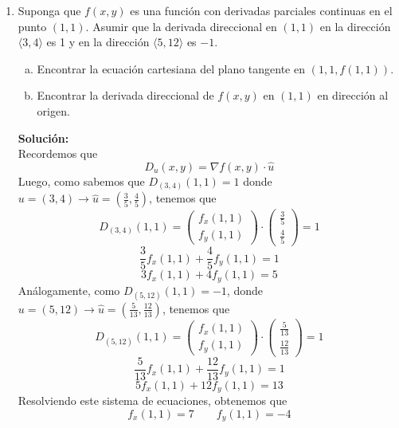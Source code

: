 \documentclass[12pt]{article}
\newenvironment{solucion}
{\begin{mdframed}[backgroundcolor=black!10]
		{\bf Solución:}\\
	}
	{
	\end{mdframed}
}
\newenvironment{preguntas}
{\begin{enumerate}\itemsep12pt
	}
	{
	\end{enumerate}
}
\newcommand{\ra}{\rightarrow}
\begin{document}
\begin{preguntas}
\begin{solucion}
\begin{enumerate}[a)]
\item 
\item 
\end{enumerate}
\end{solucion}
\item Suponga que $f(x,y)$ es una función con derivadas parciales continuas en el punto $(1,1)$. Asumir que la derivada direccional en $(1,1)$ en la dirección $\langle3,4\rangle$ 			es 1 y en la dirección $\langle5,12\rangle$ es $-1$.
\begin{enumerate}[a)]
\item Encontrar la ecuación cartesiana del plano tangente en $(1,1,f(1,1))$.
\item Encontrar la derivada direccional de $f(x,y)$ en $(1,1)$ en dirección al origen.	
\end{enumerate}
\begin{solucion}
Recordemos que 
$$D_u(x,y) = \nabla f(x,y) \cdot \hat{u}$$
Luego, como sabemos que $D_{(3,4)}(1,1) = 1$ donde $u = (3,4) \ra \hat{u} = (\frac{3}{5}, \frac{4}{5})$, tenemos que
$$D_{(3,4)}(1,1) = \begin{pmatrix}f_x(1,1) \\ f_y(1,1)\end{pmatrix} \cdot \begin{pmatrix}\frac{3}{5} \\ \frac{4}{5}\end{pmatrix} = 1$$
$$\dfrac{3}{5}f_x(1,1) + \dfrac{4}{5}f_y(1,1) = 1$$
$$3f_x(1,1) + 4f_y(1,1) = 5$$
Análogamente, como $D_{(5,12)}(1,1) = -1$, donde $u=(5,12) \ra \hat{u} = (\frac{5}{13}, \frac{12}{13})$, tenemos que
$$D_{(5,12)}(1,1) = \begin{pmatrix}f_x(1,1) \\ f_y(1,1)\end{pmatrix} \cdot \begin{pmatrix}\frac{5}{13} \\ \frac{12}{13}\end{pmatrix} = 1$$
$$\dfrac{5}{13}f_x(1,1) + \dfrac{12}{13}f_y(1,1) = 1$$
$$5f_x(1,1) + 12f_y(1,1) = 13$$
Resolviendo este sistema de ecuaciones, obtenemos que
$$f_x(1,1) = 7 \qquad f_y(1,1) = -4$$
\end{solucion}
\end{preguntas}
\end{document}
